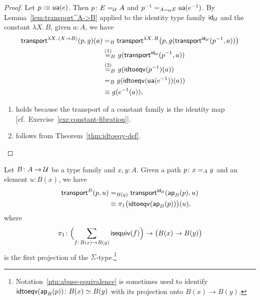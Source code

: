 \begin{proof}
    Let $p\mathrel{\vcentcolon}\equiv\mathsf{ua}(e)$. Then $p\colon E\eq\univ A$ and $p^{-1}\mathrel{=_{A\mathrel{=_{\mathcal U}} E}}\mathsf{ua}(e^{-1})$. By Lemma~\ref{lem:transport^A->B} applied to the identity type family $\mathsf{id}_\mathcal U$ and the constant $\lambda X.\,B$, given $a\colon A$, we have
    \begin{align*}
        \mathsf{transport}^{\lambda X.\,(X\to B)}
            (p,g)(a)
            &\mathrel{=_{B}}
                \mathsf{transport}^{\lambda X.\,B}
                \bigl(
                    p,
                    g(
                        \mathsf{transport}^{\mathsf{id}_\mathcal U}
                        (
                            p^{-1},a
                        )
                    )
                \bigr)\\
            &\stackrel{\text{(1)}\hphantom{_B}}{\mathrel{=_{B}}}g
                (
                    \mathsf{transport}^{\mathsf{id}_\mathcal U}(p^{-1},a)
                )\\
            &\stackrel{\text{(2)}\hphantom{_B}}{\mathrel{=_{B}}}g(\mathsf{idtoeqv}(p^{-1})(a))\\
            &\mathrel{=_{B}}g(\mathsf{idtoeqv}(\mathsf{ua}(e^{-1}))(a))\\
            &\equiv g(e^{-1}(a)),
    \end{align*}
    \begin{enumerate}[(1)]
        \item holds because the transport of a constant family is the identity map [cf.~Exercise~\ref{exr:constant-fibration}].
        \item follows from Theorem~\ref{thm:idtoeqv-def}.
    \end{enumerate}
    
\end{proof}

\begin{prop}\label{prop:id-transport-and-ap}
    Let\/ $B\colon A\to\univ$ be a type family and\/ $x,y\colon A$. Given a path\/ $p\colon x\eq{A}y$ and an element\/ $u\colon B(x)$, we have
    \begin{align*}
        \mathsf{transport}^B(p,u)
            &\mathrel{=_{B(y)}}\mathsf{transport}^{\mathsf{id}_\mathcal U}(\mathsf{ap}_B(p),u) \\
            &\equiv\pi_1
                \bigl(
                    \mathsf{idtoeqv}(\mathsf{ap}_B(p))
                \bigr)(u),
    \end{align*}
    where
    \[
        \pi_1\colon
            \Bigl(
                \sum_{f\colon B(x)\to B(y)}\fun{isequiv}(f)
            \Bigr)
            \to\bigl(B(x)\to B(y)\bigr)
    \]
    is the first projection of the $\Sigma$-type.\footnote{Notation~\ref{ntn:abuse-equivalence} is sometimes used to identify $\fun{idtoeqv}(\fun{ap}_B(p))\colon B(x)\simeq B(y)$ with its projection onto $B(x)\to B(y)$.}
\end{prop}

